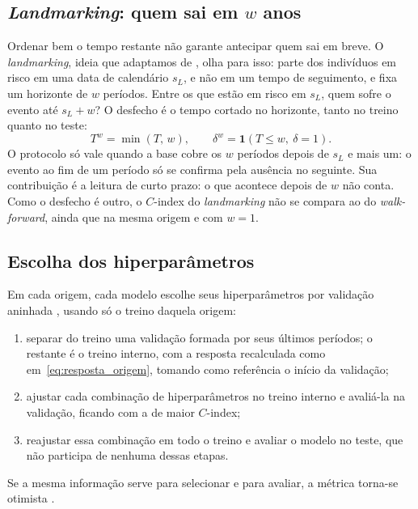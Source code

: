     \subsection{\textit{Landmarking}: quem sai em \texorpdfstring{$w$}{w} anos}
    \label{subsec:landmarking}

Ordenar bem o tempo restante não garante antecipar quem sai em breve. O \textit{landmarking}, ideia que adaptamos de \citet{van_houwelingen2007}, olha para isso: parte dos indivíduos em risco em uma data de calendário $s_L$, e não em um tempo de seguimento, e fixa um horizonte de $w$ períodos. Entre os que estão em risco em $s_L$, quem sofre o evento até $s_L + w$? O desfecho é o tempo cortado no horizonte, tanto no treino quanto no teste:
\begin{equation}
  T^{w} = \min(T,\, w),
  \qquad
  \delta^{w} = \mathbf{1}(T \leq w,\ \delta = 1).
  \label{eq:landmark}
\end{equation}
O protocolo só vale quando a base cobre os $w$ períodos depois de $s_L$ e mais um: o evento ao fim de um período só se confirma pela ausência no seguinte. Sua contribuição é a leitura de curto prazo: o que acontece depois de $w$ não conta. Como o desfecho é outro, o $C$-index do \textit{landmarking} não se compara ao do \textit{walk-forward}, ainda que na mesma origem e com $w = 1$.

    \subsection{Escolha dos hiperparâmetros}
    \label{subsec:validacao_interna}

Em cada origem, cada modelo escolhe seus hiperparâmetros por validação aninhada \citep{varma2006}, usando só o treino daquela origem:
\begin{enumerate}
    \item separar do treino uma validação formada por seus últimos períodos; o restante é o treino interno, com a resposta recalculada como em~\eqref{eq:resposta_origem}, tomando como referência o início da validação;
    \item ajustar cada combinação de hiperparâmetros no treino interno e avaliá-la na validação, ficando com a de maior $C$-index;
    \item reajustar essa combinação em todo o treino e avaliar o modelo no teste, que não participa de nenhuma dessas etapas.
\end{enumerate}
Se a mesma informação serve para selecionar e para avaliar, a métrica torna-se otimista \citep{cawley2010}.

